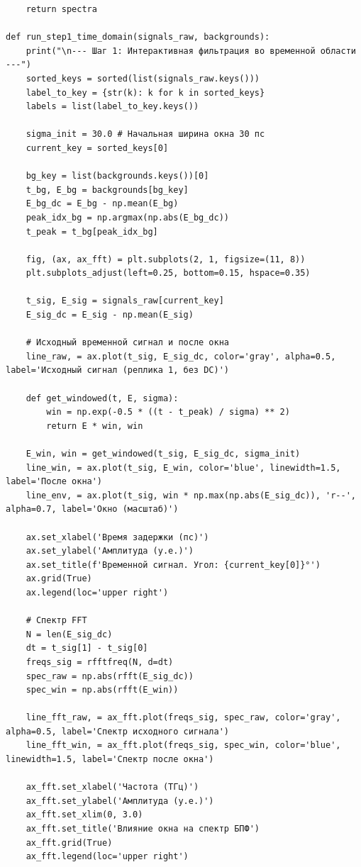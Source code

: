 \begin{verbatim}
    return spectra

def run_step1_time_domain(signals_raw, backgrounds):
    print("\n--- Шаг 1: Интерактивная фильтрация во временной области ---")
    sorted_keys = sorted(list(signals_raw.keys()))
    label_to_key = {str(k): k for k in sorted_keys}
    labels = list(label_to_key.keys())
    
    sigma_init = 30.0 # Начальная ширина окна 30 пс
    current_key = sorted_keys[0]
    
    bg_key = list(backgrounds.keys())[0]
    t_bg, E_bg = backgrounds[bg_key]
    E_bg_dc = E_bg - np.mean(E_bg)
    peak_idx_bg = np.argmax(np.abs(E_bg_dc))
    t_peak = t_bg[peak_idx_bg]
    
    fig, (ax, ax_fft) = plt.subplots(2, 1, figsize=(11, 8))
    plt.subplots_adjust(left=0.25, bottom=0.15, hspace=0.35)
    
    t_sig, E_sig = signals_raw[current_key]
    E_sig_dc = E_sig - np.mean(E_sig)
    
    # Исходный временной сигнал и после окна
    line_raw, = ax.plot(t_sig, E_sig_dc, color='gray', alpha=0.5, label='Исходный сигнал (реплика 1, без DC)')
    
    def get_windowed(t, E, sigma):
        win = np.exp(-0.5 * ((t - t_peak) / sigma) ** 2)
        return E * win, win
        
    E_win, win = get_windowed(t_sig, E_sig_dc, sigma_init)
    line_win, = ax.plot(t_sig, E_win, color='blue', linewidth=1.5, label='После окна')
    line_env, = ax.plot(t_sig, win * np.max(np.abs(E_sig_dc)), 'r--', alpha=0.7, label='Окно (масштаб)')
    
    ax.set_xlabel('Время задержки (пс)')
    ax.set_ylabel('Амплитуда (у.е.)')
    ax.set_title(f'Временной сигнал. Угол: {current_key[0]}°')
    ax.grid(True)
    ax.legend(loc='upper right')
    
    # Спектр FFT
    N = len(E_sig_dc)
    dt = t_sig[1] - t_sig[0]
    freqs_sig = rfftfreq(N, d=dt)
    spec_raw = np.abs(rfft(E_sig_dc))
    spec_win = np.abs(rfft(E_win))
    
    line_fft_raw, = ax_fft.plot(freqs_sig, spec_raw, color='gray', alpha=0.5, label='Спектр исходного сигнала')
    line_fft_win, = ax_fft.plot(freqs_sig, spec_win, color='blue', linewidth=1.5, label='Спектр после окна')
    
    ax_fft.set_xlabel('Частота (ТГц)')
    ax_fft.set_ylabel('Амплитуда (у.е.)')
    ax_fft.set_xlim(0, 3.0)
    ax_fft.set_title('Влияние окна на спектр БПФ')
    ax_fft.grid(True)
    ax_fft.legend(loc='upper right')
    

\end{verbatim}
